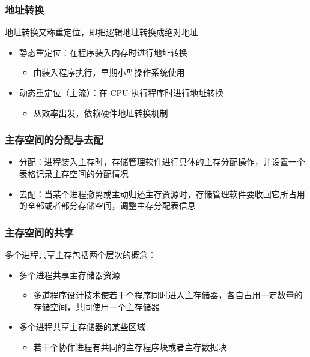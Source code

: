 \documentclass[cs4size,a4paper,10pt]{ctexart}
\begin{document}
	\subsubsection{地址转换}
	地址转换又称重定位，即把逻辑地址转换成绝对地址
	\begin{itemize}
		\item 静态重定位：在程序装入内存时进行地址转换
		\begin{itemize}
			\item 由装入程序执行，早期小型操作系统使用
		\end{itemize}
		\item 动态重定位（主流）：在 CPU 执行程序时进行地址转换
		\begin{itemize}
			\item 从效率出发，依赖硬件地址转换机制
		\end{itemize}
	\end{itemize}

	\subsubsection{主存空间的分配与去配}
	\begin{itemize}
		\item 分配：进程装入主存时，存储管理软件进行具体的主存分配操作，并设置一个表格记录主存空间的分配情况
		\item 去配：当某个进程撤离或主动归还主存资源时，存储管理软件要收回它所占用的全部或者部分存储空间，调整主存分配表信息
	\end{itemize}

	\subsubsection{主存空间的共享}
	多个进程共享主存包括两个层次的概念：
	\begin{itemize}
		\item 多个进程共享主存储器资源
		\begin{itemize}
			\item 多道程序设计技术使若干个程序同时进入主存储器，各自占用一定数量的存储空间，共同使用一个主存储器
		\end{itemize}
		\item 多个进程共享主存储器的某些区域
		\begin{itemize}
			\item 若干个协作进程有共同的主存程序块或者主存数据块
		\end{itemize}
	\end{itemize}
\end{document}
